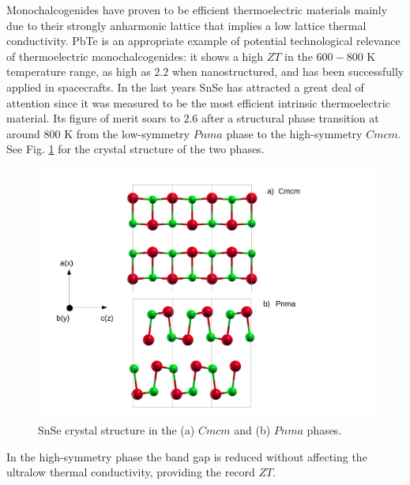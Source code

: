 Monochalcogenides have proven to be efficient thermoelectric materials\cite{heremans2008enhancement,zhang2013high,yang2008nanostructures,cho2011thermoelectric} mainly due to their strongly anharmonic lattice that implies a low 
lattice thermal conductivity\cite{delaire2011giant,li2014phonon,iizumi1975phase,o2017inelastic,ribeiro2018strong}. PbTe is an appropriate example of potential technological relevance of thermoelectric monochalcogenides: it shows 
a high $ZT$ in the $600-800$ K temperature range\cite{ravich2013semiconducting}, as high as $2.2$ when nanostructured\cite{hsu2004cubic}, and has been successfully applied in spacecrafts\cite{rowe2018thermoelectrics}. In the last 
years SnSe has attracted a great deal of attention since it was measured to be the most efficient intrinsic thermoelectric material\cite{zhao2014ultralow}. Its figure of merit soars to $2.6$ after a structural phase 
transition\cite{zhao2014ultralow,adouby1998structure,chattopadhyay1986neutron,von1981high,chatterji2018soft} at around $800$ K from the low-symmetry $Pnma$ phase to the high-symmetry $Cmcm$. See Fig. \ref{pnma-cmcm} for the crystal 
structure of the two phases.
\begin{figure}[h]
\begin{center}
\includegraphics[width=0.8\linewidth]{Figures/pnma-cmcm.pdf}
\caption[SnSe crystal structure]{SnSe crystal structure in the (a) $Cmcm$ and (b) $Pnma$ phases.}
\label{pnma-cmcm}
\end{center}
\end{figure}
In the high-symmetry phase the band gap is reduced without affecting the ultralow thermal conductivity, providing the record $ZT$. \\

